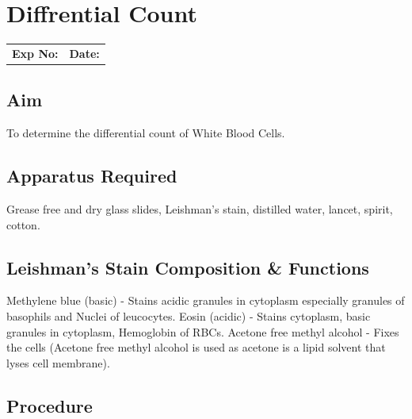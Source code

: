 \documentclass[a4paper,12pt]{book}
\begin{document}
					\chapter*{\centering Diffrential Count}
					\begin{tabular}{p{5in} p{1in}}
						\textbf{Exp No:}  & \textbf{Date:}\\
					\end{tabular}

					\section*{Aim}
					To determine the differential count of White Blood Cells.
					\section*{Apparatus Required}
					Grease free and dry glass slides, Leishman’s stain, distilled water, lancet, spirit, cotton.	
					\section*{Leishman's Stain Composition \& Functions}
					Methylene blue (basic) 	     -	Stains acidic granules in cytoplasm especially 						granules of basophils and Nuclei of leucocytes.\newline
					Eosin (acidic) 		     -	Stains cytoplasm, basic granules in 							cytoplasm, Hemoglobin of RBCs.\newline
					Acetone free methyl alcohol - 	Fixes the cells (Acetone free methyl alcohol 						is used as acetone is a lipid solvent that 		lyses cell membrane).\newline 

					\section*{Procedure}
\end{document}

